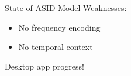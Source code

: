 




\begin{frame}{State of ASID}
    Model Weaknesses:
    \begin{itemize}
        \item No frequency encoding
        \item No temporal context
    \end{itemize}
    Desktop app progress!
\end{frame}

